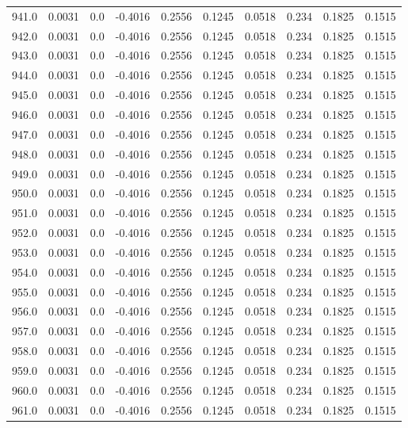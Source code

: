 \begin{longtable}{lrrrrrrrrr}
941.0 & 0.0031 & 0.0 & -0.4016 & 0.2556 & 0.1245 & 0.0518 & 0.234 & 0.1825 & 0.1515 \\
942.0 & 0.0031 & 0.0 & -0.4016 & 0.2556 & 0.1245 & 0.0518 & 0.234 & 0.1825 & 0.1515 \\
943.0 & 0.0031 & 0.0 & -0.4016 & 0.2556 & 0.1245 & 0.0518 & 0.234 & 0.1825 & 0.1515 \\
944.0 & 0.0031 & 0.0 & -0.4016 & 0.2556 & 0.1245 & 0.0518 & 0.234 & 0.1825 & 0.1515 \\
945.0 & 0.0031 & 0.0 & -0.4016 & 0.2556 & 0.1245 & 0.0518 & 0.234 & 0.1825 & 0.1515 \\
946.0 & 0.0031 & 0.0 & -0.4016 & 0.2556 & 0.1245 & 0.0518 & 0.234 & 0.1825 & 0.1515 \\
947.0 & 0.0031 & 0.0 & -0.4016 & 0.2556 & 0.1245 & 0.0518 & 0.234 & 0.1825 & 0.1515 \\
948.0 & 0.0031 & 0.0 & -0.4016 & 0.2556 & 0.1245 & 0.0518 & 0.234 & 0.1825 & 0.1515 \\
949.0 & 0.0031 & 0.0 & -0.4016 & 0.2556 & 0.1245 & 0.0518 & 0.234 & 0.1825 & 0.1515 \\
950.0 & 0.0031 & 0.0 & -0.4016 & 0.2556 & 0.1245 & 0.0518 & 0.234 & 0.1825 & 0.1515 \\
951.0 & 0.0031 & 0.0 & -0.4016 & 0.2556 & 0.1245 & 0.0518 & 0.234 & 0.1825 & 0.1515 \\
952.0 & 0.0031 & 0.0 & -0.4016 & 0.2556 & 0.1245 & 0.0518 & 0.234 & 0.1825 & 0.1515 \\
953.0 & 0.0031 & 0.0 & -0.4016 & 0.2556 & 0.1245 & 0.0518 & 0.234 & 0.1825 & 0.1515 \\
954.0 & 0.0031 & 0.0 & -0.4016 & 0.2556 & 0.1245 & 0.0518 & 0.234 & 0.1825 & 0.1515 \\
955.0 & 0.0031 & 0.0 & -0.4016 & 0.2556 & 0.1245 & 0.0518 & 0.234 & 0.1825 & 0.1515 \\
956.0 & 0.0031 & 0.0 & -0.4016 & 0.2556 & 0.1245 & 0.0518 & 0.234 & 0.1825 & 0.1515 \\
957.0 & 0.0031 & 0.0 & -0.4016 & 0.2556 & 0.1245 & 0.0518 & 0.234 & 0.1825 & 0.1515 \\
958.0 & 0.0031 & 0.0 & -0.4016 & 0.2556 & 0.1245 & 0.0518 & 0.234 & 0.1825 & 0.1515 \\
959.0 & 0.0031 & 0.0 & -0.4016 & 0.2556 & 0.1245 & 0.0518 & 0.234 & 0.1825 & 0.1515 \\
960.0 & 0.0031 & 0.0 & -0.4016 & 0.2556 & 0.1245 & 0.0518 & 0.234 & 0.1825 & 0.1515 \\
961.0 & 0.0031 & 0.0 & -0.4016 & 0.2556 & 0.1245 & 0.0518 & 0.234 & 0.1825 & 0.1515 \\

\end{longtable}
